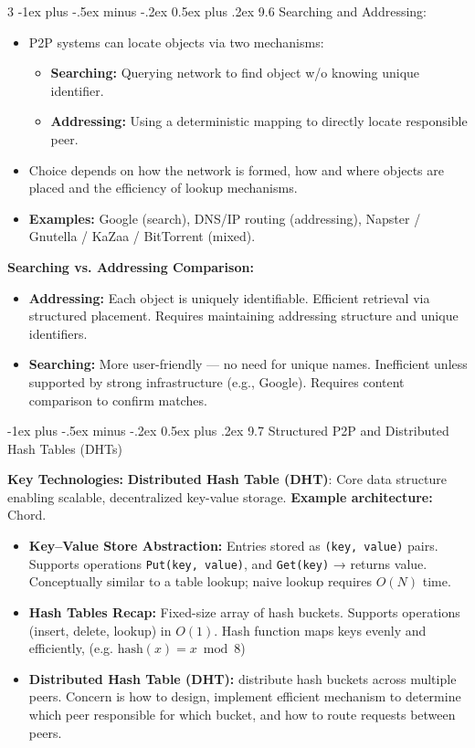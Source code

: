 \documentclass[a4paper, 9pt, landscape]{article}
\makeatletter
\renewcommand{\subsection}{\@startsection{subsubsection}{3}{0mm}%
                                {-1ex plus -.5ex minus -.2ex}%
                                {0.5ex plus .2ex}%
                                {\normalfont\small\bfseries}}
\makeatother
\begin{document}
\begin{multicols*}{3}
\subsection{9.6 Searching and Addressing:}
\begin{itemize}
    \item P2P systems can locate objects via two mechanisms:
    \begin{itemize}
        \item \textbf{Searching:} Querying network to find object w/o knowing unique identifier.
        \item \textbf{Addressing:} Using a deterministic mapping to directly locate responsible peer.
    \end{itemize}
    \item Choice depends on how the network is formed, how and where objects are placed and the efficiency of lookup mechanisms.
    \item \textbf{Examples:} Google (search), DNS/IP routing (addressing), Napster / Gnutella / KaZaa / BitTorrent (mixed).
\end{itemize}

\textbf{Searching vs. Addressing Comparison:}
\begin{itemize}
    \item \textbf{Addressing:} Each object is uniquely identifiable. Efficient retrieval via structured placement. Requires maintaining addressing structure and unique identifiers.
    \item \textbf{Searching:} More user-friendly — no need for unique names. Inefficient unless supported by strong infrastructure (e.g., Google). Requires content comparison to confirm matches.
\end{itemize}

\subsection{9.7 Structured P2P and Distributed Hash Tables (DHTs)}

\textbf{Key Technologies:} \textbf{Distributed Hash Table (DHT)}: Core data structure enabling scalable, decentralized key-value storage. \textbf{Example architecture:} Chord.

\begin{itemize}
\item \textbf{Key–Value Store Abstraction:} Entries stored as \texttt{(key, value)} pairs. Supports operations \texttt{Put(key, value)}, and \texttt{Get(key)} → returns value. Conceptually similar to a table lookup; naive lookup requires $O(N)$ time.
\item \textbf{Hash Tables Recap:} Fixed-size array of hash buckets. Supports operations (insert, delete, lookup) in $O(1)$. Hash function maps keys evenly and efficiently, (e.g. $\text{hash}(x) = x \bmod 8$)
\item \textbf{Distributed Hash Table (DHT):} distribute hash buckets across multiple peers. Concern is how to design, implement efficient mechanism to determine which peer responsible for which bucket, and how to route requests between peers.
\end{itemize}



\end{multicols*}
\end{document}
